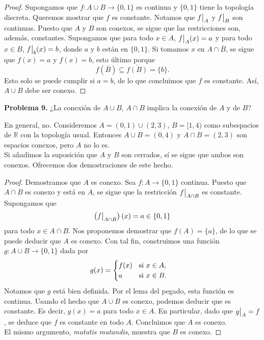 \documentclass{article}
\newcommand\restr[2]{{%
		\left.\kern-\nulldelimiterspace %
		#1 %
		\vphantom{\big|} %
		\right|_{#2} %
}}
\begin{document}
\begin{proof}
	Supongamos que $f: A \cup B \rightarrow \{ 0, 1\}$ es continua y $\{0, 1\}$ tiene la topología discreta. Queremos mostrar que $f$ es constante. Notamos que $\restr{f}{A}$ y $\restr{f}{B}$ son continuas. Puesto que $A$ y $B$ son conexos, se sigue que las restricciones son, además, constantes. Supongamos que para todo $x \in A$, $\restr{f}{A}(x) = a$ y para todo $x \in B$, $\restr{f}{b}(x) = b$, donde $a$ y $b$ están en $\{0, 1\}$. Si tomamos $x$ en $A \cap \overline{B}$, se sigue que $f(x) = a$ y $f(x) = b$, esto último porque
	$$ f(\overline{B}) \subseteq \overline{f(B)} = \{ b \}.$$
	Esto solo se puede cumplir si $a = b$, de lo que concluimos que $f$ es constante. Así, $A \cup B$ debe ser conexo. 
\end{proof}

\begin{mybox}
	\textbf{Problema 9. } ¿La conexión de $A \cup B$, $A \cap B$ implica la conexión de $A$ y de $B$?
\end{mybox}	

En general, no. Consideremos $A = (0,1) \cup (2, 3 )$, $B = [1, 4)$ como subespacios de $\mathbb{R}$ con la topología usual. Entonces $A \cup B = (0, 4)$ y $A \cap B = (2, 3)$ son espacios conexos, pero $A$ no lo es. \\
Si añadimos la suposición que $A$ y $B$ son cerrados, sí se sigue que ambos son conexos. Ofrecemos dos demostraciones de este hecho. 
\begin{proof}
	Demostramos que $A$ es conexo. Sea $f: A \rightarrow \{0,1 \}$ continua. Puesto que $A \cap B$ es conexo y está en $A$, se sigue que la restricción $\restr{f}{A \cap B}$ es constante. Supongamos que $$\left(\restr{f}{A \cap B}\right)(x) = a \in \{ 0,1 \}$$
	para todo $x \in A \cap B$. Nos proponemos demostrar que $f(A) = \{ a \}$, de lo que se puede deducir que $A$ es conexo. Con tal fin, construimos una función $g: A \cup B \rightarrow \{0,1\}$ dada por
	\begin{equation*}
	g(x) =
	\begin{cases}
	f(x) \hspace{0.2cm} \text{ si } x \in A, \\ 
	a  \hspace{0.7cm} \text{ si } x \in B.
	\end{cases}
	\end{equation*}
Notamos que $g$ está bien definida. Por el lema del pegado, esta función es continua. Usando el hecho que $A \cup B$ es conexo, podemos deducir que es constante. Es decir, $g(x) = a$ para todo $x \in A$. En particular, dado que $\restr{g}{A} = f$, se deduce que $f$ es constante en todo $A$. Concluimos que $A$ es conexo. \\
El mismo argumento, \textit{mutatis mutandis}, muestra que $B$ es conexo. 

\end{proof}
\end{document}
